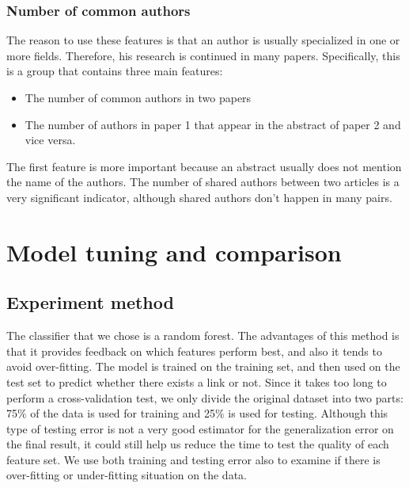 \documentclass{article}
\begin{document}
\subsubsection{Number of common authors}

The reason to use these features is that an author is usually specialized in one or more fields. Therefore, his research is continued in many papers. Specifically, this is a group that contains three main features:
\begin{itemize}
\item The number of common authors in two papers
\item The number of authors in paper 1 that appear in the abstract of paper 2 and vice versa.
\end{itemize}
The first feature is more important because an abstract usually does not mention the name of the authors. The number of shared authors between two articles is a very significant indicator, although shared authors don't happen in many pairs. 
\section{Model tuning and comparison}
\label{sec:experiments}

\subsection{Experiment method}

The classifier that we chose is a random forest. The advantages of this method is that it provides feedback on which features perform best, and also it tends to avoid over-fitting. The model is trained on the training set, and then used on the test set to predict whether there exists a link or not. Since it takes too long to perform a cross-validation test, we only divide the original dataset into two parts: 75$\%$ of the data is used for training and 25$\%$ is used for testing. Although this type of testing error is not a very good estimator for the generalization error on the final result, it could still help us reduce the time to test the quality of each feature set. We use both training and testing error also to examine if there is over-fitting or under-fitting situation on the data.
\end{document}
